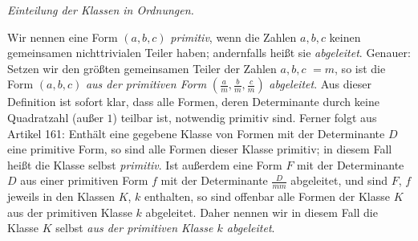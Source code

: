 \begin{center}
\textit{Einteilung der Klassen in Ordnungen.}
\end{center}

Wir nennen eine Form $(a,b,c)$ \textit{primitiv}, wenn die Zahlen $a,b,c$ keinen gemeinsamen nichttrivialen Teiler haben; andernfalls heißt sie \textit{abgeleitet}. Genauer: Setzen wir den größten gemeinsamen Teiler der Zahlen $a,b,c$ $=m$, so ist die Form $(a,b,c)$ \textit{aus der primitiven Form} $\left(\frac{a}{m},\frac{b}{m},\frac{c}{m}\right)$ \textit{abgeleitet}. Aus dieser Definition ist sofort klar, dass alle Formen, deren Determinante durch keine Quadratzahl (außer $1$) teilbar ist, notwendig primitiv sind. Ferner folgt aus Artikel 161: Enthält eine gegebene Klasse von Formen mit der Determinante $D$ eine primitive Form, so sind alle Formen dieser Klasse primitiv; in diesem Fall
heißt die Klasse selbst \textit{primitiv}. Ist außerdem eine Form $F$ mit der Determinante $D$ aus einer primitiven Form $f$ mit der Determinante $\frac{D}{mm}$ abgeleitet, und sind $F$, $f$ jeweils in den Klassen $K$, $k$ enthalten, so sind offenbar alle Formen der Klasse $K$ aus der primitiven Klasse $k$ abgeleitet. Daher nennen wir in diesem Fall die Klasse $K$ selbst \textit{aus der primitiven Klasse $k$ abgeleitet}.

